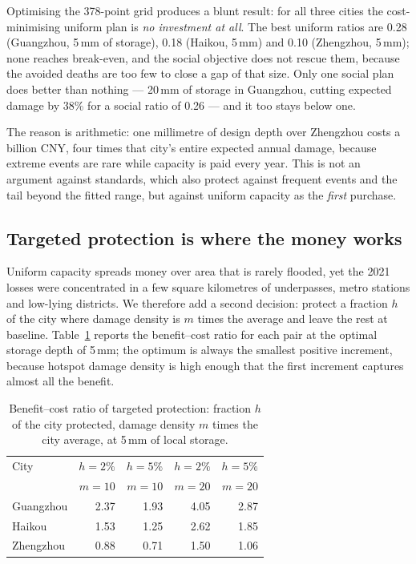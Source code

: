 Optimising the 378-point grid produces a blunt result: for all three cities the cost-minimising uniform plan is \emph{no investment at all}. The best uniform ratios are 0.28 (Guangzhou, 5\,mm of storage), 0.18 (Haikou, 5\,mm) and 0.10 (Zhengzhou, 5\,mm); none reaches break-even, and the social objective does not rescue them, because the avoided deaths are too few to close a gap of that size. Only one social plan does better than nothing --- 20\,mm of storage in Guangzhou, cutting expected damage by 38\% for a social ratio of 0.26 --- and it too stays below one.

The reason is arithmetic: one millimetre of design depth over Zhengzhou costs a billion CNY, four times that city's entire expected annual damage, because extreme events are rare while capacity is paid every year. This is not an argument against standards, which also protect against frequent events and the tail beyond the fitted range, but against uniform capacity as the \emph{first} purchase.

\subsection{Targeted protection is where the money works}

Uniform capacity spreads money over area that is rarely flooded, yet the 2021 losses were concentrated in a few square kilometres of underpasses, metro stations and low-lying districts. We therefore add a second decision: protect a fraction $h$ of the city where damage density is $m$ times the average and leave the rest at baseline. Table~\ref{tab:q5sel} reports the benefit--cost ratio for each pair at the optimal storage depth of 5\,mm; the optimum is always the smallest positive increment, because hotspot damage density is high enough that the first increment captures almost all the benefit.

\begin{table}[H]
\centering
\caption{Benefit--cost ratio of targeted protection: fraction $h$ of the city protected, damage density $m$ times the city average, at 5\,mm of local storage.}
\label{tab:q5sel}
\footnotesize
\setlength{\tabcolsep}{4pt}
\begin{tabular}{lrrrr}
\toprule
City & $h{=}2\%$ & $h{=}5\%$ & $h{=}2\%$ & $h{=}5\%$\\
 & $m{=}10$ & $m{=}10$ & $m{=}20$ & $m{=}20$\\
\midrule
Guangzhou & 2.37 & 1.93 & 4.05 & 2.87\\
Haikou & 1.53 & 1.25 & 2.62 & 1.85\\
Zhengzhou & 0.88 & 0.71 & 1.50 & 1.06\\
\bottomrule
\end{tabular}
\end{table}

